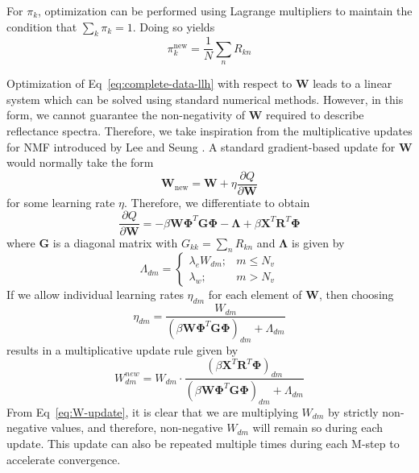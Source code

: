 \documentclass[remotesensing,article,submit,pdftex,moreauthors]{Definitions/mdpi}
\begin{document}
For $\pi_k$, optimization can be performed using Lagrange multipliers to maintain the condition that $\sum_k\pi_k=1$. Doing so yields
\begin{equation}\label{eq:pi-update}
    \pi_k^{\text{new}}  = \frac{1}{N}\sum_n R_{kn}
\end{equation}

Optimization of Eq~\ref{eq:complete-data-llh} with respect to $\mathbf{W}$ leads to a linear system which can be solved using standard numerical methods. However, in this form, we cannot guarantee the non-negativity of $\mathbf{W}$ required to describe reflectance spectra. Therefore, we take inspiration from the multiplicative updates for NMF introduced by Lee and Seung \cite{nmf-orig}. A standard gradient-based update for $\mathbf{W}$ would normally take the form
\begin{equation}
    \mathbf{W}_{\text{new}} = \mathbf{W} + \eta\frac{\partial Q}{\partial \mathbf{W}}
\end{equation}
for some learning rate $\eta$. Therefore, we differentiate to obtain
\begin{equation}
    \frac{\partial Q}{\partial \mathbf{W}} = -\beta \mathbf{W}\mathbf{\Phi}^T\mathbf{G}\mathbf{\Phi} - \mathbf{\Lambda} + \beta \mathbf{X}^T\mathbf{R}^T\mathbf{\Phi}
\end{equation}
where $\mathbf{G}$ is a diagonal matrix with $G_{kk} = \sum_n R_{kn}$ and $\mathbf{\Lambda}$ is given by 
\begin{equation}
    \Lambda_{dm} = \begin{cases}
        \lambda_e W_{dm}; & m \leq N_v \\ 
        \lambda_w; & m > N_v
    \end{cases}
\end{equation}
If we allow individual learning rates $\eta_{dm}$ for each element of $\mathbf{W}$, then choosing 
\begin{equation}
    \eta_{dm} = \frac{W_{dm}}{\left(\beta \mathbf{W}\mathbf{\Phi}^T\mathbf{G}\mathbf{\Phi}\right)_{dm} + \Lambda_{dm}}
\end{equation}
results in a multiplicative update rule given by
\begin{equation}\label{eq:W-update}
    W_{dm}^{new}  = W_{dm} \cdot \dfrac{\left(\beta \mathbf{X}^T\mathbf{R}^T\mathbf{\Phi}\right)_{dm}}{\left(\beta \mathbf{W}\mathbf{\Phi}^T\mathbf{G}\mathbf{\Phi}\right)_{dm} + \Lambda_{dm}}
\end{equation}
From Eq~\ref{eq:W-update}, it is clear that we are multiplying $W_{dm}$ by strictly non-negative values, and therefore, non-negative $W_{dm}$ will remain so during each update. This update can also be repeated multiple times during each M-step to accelerate convergence.
\end{document}
